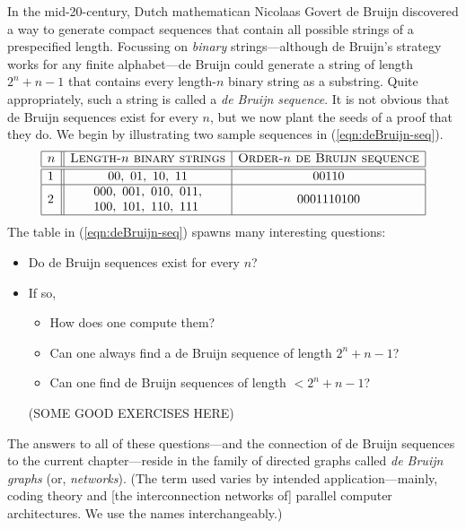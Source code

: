 In the mid-20-century, Dutch mathematican Nicolaas Govert de Bruijn
 discovered a way to generate
compact sequences that contain all possible strings of a prespecified
length.  Focussing on {\em binary} strings---although de Bruijn's
strategy works for any finite alphabet---de Bruijn could generate a
string of length $2^n +n-1$ that contains every length-$n$ binary
string as a substring.  Quite appropriately, such a string is called a
{\it de Bruijn sequence}.  It is not obvious
that de Bruijn sequences exist for every $n$, but we now plant the
seeds of a proof that they do.  We begin by illustrating two sample
sequences in (\ref{eqn:deBruijn-seq}).
\begin{equation}
\label{eqn:deBruijn-seq}
\begin{array}{|l||c|c|}
\hline
n & \mbox{\sc Length-$n$ binary strings}
    & \mbox{\sc Order-$n$ de Bruijn sequence} \\
\hline
\hline
1 &
00, \ 01, \ 10, \ 11  & 00110 \\
\hline
2 &
\begin{array}{l}
000, \ 001, \ 010, \ 011, \\
100, \ 101, \ 110, \ 111 
\end{array}
  & 0001110100 \\
\hline
\end{array}
\end{equation}
The table in (\ref{eqn:deBruijn-seq}) spawns many interesting
questions:
\begin{itemize}
\item
Do de Bruijn sequences exist for every $n$?
\item
If so, 
  \begin{itemize}
  \item
How does one compute them?
  \item
Can one always find a de Bruijn sequence of length $2^n +n-1$?
  \item
Can one find de Bruijn sequences of length $< 2^n +n-1$?
  \end{itemize}
 {\Arny (SOME GOOD EXERCISES HERE)}  
\end{itemize}
The answers to all of these questions---and the connection of de
Bruijn sequences to the current chapter---reside in the family of
directed graphs called {\it de Bruijn graphs} (or, {\it networks}).
  (The term used
varies by intended application---mainly, coding theory and [the
  interconnection networks of] parallel computer architectures.  We
use the names interchangeably.)

